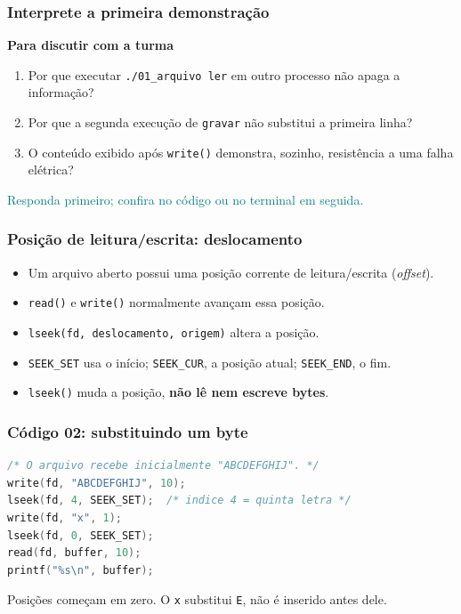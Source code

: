 \documentclass[aspectratio=169,11pt]{beamer}
\begin{document}
\begin{frame}
\frametitle{Interprete a primeira demonstração}
{\large\textbf{Para discutir com a turma}}\par\medskip\begin{enumerate}\item Por que executar \texttt{./01\_arquivo ler} em outro processo não apaga a informação?
\item Por que a segunda execução de \texttt{gravar} não substitui a primeira linha?
\item O conteúdo exibido após \texttt{write()} demonstra, sozinho, resistência a uma falha elétrica?
\end{enumerate}\vfill\textcolor{teal}{\footnotesize Responda primeiro; confira no código ou no terminal em seguida.}
\end{frame}

\begin{frame}
\frametitle{Posição de leitura/escrita: deslocamento}
\large
\begin{itemize}
\item Um arquivo aberto possui uma posição corrente de leitura/escrita (\textit{offset}).
\item \texttt{read()} e \texttt{write()} normalmente avançam essa posição.
\item \texttt{lseek(fd, deslocamento, origem)} altera a posição.
\item \texttt{SEEK\_SET} usa o início; \texttt{SEEK\_CUR}, a posição atual; \texttt{SEEK\_END}, o fim.
\item \texttt{lseek()} muda a posição, \textbf{não lê nem escreve bytes}.
\end{itemize}

\end{frame}

\begin{frame}[fragile]
\frametitle{Código 02: substituindo um byte}
\begin{lstlisting}[language=C]
/* O arquivo recebe inicialmente "ABCDEFGHIJ". */
write(fd, "ABCDEFGHIJ", 10);
lseek(fd, 4, SEEK_SET);  /* indice 4 = quinta letra */
write(fd, "x", 1);
lseek(fd, 0, SEEK_SET);
read(fd, buffer, 10);
printf("%s\n", buffer);
\end{lstlisting}
\vfill\small\textcolor{dkblue}{Posições começam em zero. O \texttt{x} substitui \texttt{E}, não é inserido antes dele.}

\end{frame}
\end{document}
